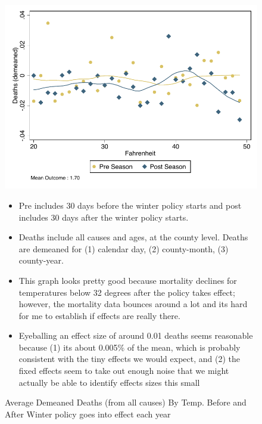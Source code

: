 \documentclass[12pt]{article}
\begin{document}
\begin{figure}
\centering
\caption{Average Demeaned Deaths (from all causes) By Temp. Before and After Winter policy goes into effect each year}
\includegraphics{figures/tgrad_deaths_all.pdf} \\
\begin{itemize}
\item Pre includes 30 days before the winter policy starts and post includes 30 days after the winter policy starts.
\item Deaths include all causes and ages, at the county level.  Deaths are demeaned for (1) calendar day, (2) county-month, (3) county-year.
\item This graph looks pretty good because mortality declines for temperatures below 32 degrees after the policy takes effect; however, the mortality data bounces around a lot and its hard for me to establish if effects are really there.
\item Eyeballing an effect size of around 0.01 deaths seems reasonable because (1) its about 0.005\% of the mean, which is probably consistent with the tiny effects we would expect, and (2) the fixed effects seem to take out enough noise that we might actually be able to identify effects sizes this small
\end{itemize}
\end{figure}
\end{document}
